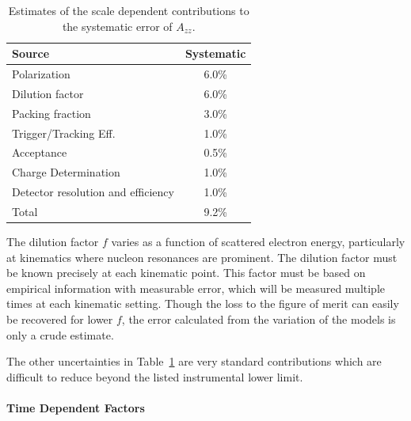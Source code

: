 \begin{table}
\begin{center}
\begin{tabular}{l|c}\hline\hline
Source                         & Systematic \\
\hline
Polarization                 &   6.0\%   \\
Dilution factor              &   6.0\%   \\
Packing fraction             &   3.0\%   \\
Trigger/Tracking Eff.        &   1.0\%   \\
Acceptance                   &   0.5\%   \\
Charge Determination          &  1.0\%  \\
Detector resolution and efficiency & 1.0\% \\
\hline
Total  &  9.2\%   \\
\hline
\end{tabular}
\caption{\label{sys-unc}Estimates of the scale dependent contributions to the systematic error of $A_{zz}$.}
\end{center}
\end{table}

The dilution factor $f$ varies as a function of scattered electron energy, particularly at
kinematics where nucleon resonances are prominent.  The dilution factor must be known precisely at each kinematic point.  This factor must be based on empirical information with measurable error, which will be measured multiple times at each kinematic setting.  Though the loss to the figure of merit can easily be recovered for lower
$f$, the error calculated from the variation of the models is only a crude estimate.

The other uncertainties in Table~\ref{sys-unc} are very standard contributions which are difficult to reduce beyond the listed instrumental lower limit.

\paragraph{Time Dependent Factors}\mbox{}
\label{timedep}

